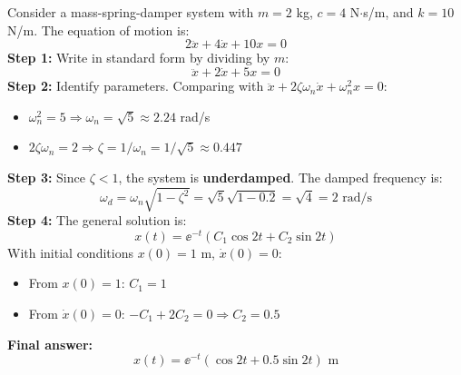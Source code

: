 \begin{examplebox}[title=Example: Mass-Spring-Damper System]
Consider a mass-spring-damper system with $m = 2$ kg, $c = 4$ N$\cdot$s/m, and $k = 10$ N/m. The equation of motion is:
\begin{equation}
2\ddot{x} + 4\dot{x} + 10x = 0
\end{equation}
\textbf{Step 1:} Write in standard form by dividing by $m$:
\begin{equation}
\ddot{x} + 2\dot{x} + 5x = 0
\end{equation}
\textbf{Step 2:} Identify parameters. Comparing with $\ddot{x} + 2\zeta\omega_n\dot{x} + \omega_n^2 x = 0$:
\begin{itemize}
    \item $\omega_n^2 = 5 \Rightarrow \omega_n = \sqrt{5} \approx 2.24$ rad/s
    \item $2\zeta\omega_n = 2 \Rightarrow \zeta = 1/\omega_n = 1/\sqrt{5} \approx 0.447$
\end{itemize}
\textbf{Step 3:} Since $\zeta < 1$, the system is \textbf{underdamped}. The damped frequency is:
\begin{equation}
\omega_d = \omega_n\sqrt{1 - \zeta^2} = \sqrt{5}\sqrt{1 - 0.2} = \sqrt{4} = 2 \text{ rad/s}
\end{equation}
\textbf{Step 4:} The general solution is:
\begin{equation}
x(t) = \ee^{-t}(C_1 \cos 2t + C_2 \sin 2t)
\end{equation}
With initial conditions $x(0) = 1$ m, $\dot{x}(0) = 0$:
\begin{itemize}
    \item From $x(0) = 1$: $C_1 = 1$
    \item From $\dot{x}(0) = 0$: $-C_1 + 2C_2 = 0 \Rightarrow C_2 = 0.5$
\end{itemize}
\textbf{Final answer:}
\begin{equation}
x(t) = \ee^{-t}\left(\cos 2t + 0.5\sin 2t\right) \text{ m}
\end{equation}
\end{examplebox}

